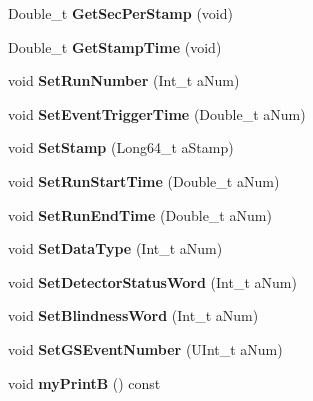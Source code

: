 \begin{DoxyCompactItemize}
\item 
\hypertarget{class_edw_event_base_aaf7066291c2dccc341e3b6ce0fe305d8}{
Double\_\-t {\bfseries GetSecPerStamp} (void)}
\label{class_edw_event_base_aaf7066291c2dccc341e3b6ce0fe305d8}

\item 
\hypertarget{class_edw_event_base_ad03198cffa842e7e9c3c8c46ac893f86}{
Double\_\-t {\bfseries GetStampTime} (void)}
\label{class_edw_event_base_ad03198cffa842e7e9c3c8c46ac893f86}

\item 
\hypertarget{class_edw_event_base_a7b2aafaae6d209b65a5f8a23d18f309f}{
void {\bfseries SetRunNumber} (Int\_\-t aNum)}
\label{class_edw_event_base_a7b2aafaae6d209b65a5f8a23d18f309f}

\item 
\hypertarget{class_edw_event_base_a9c5fa083dec2ba2025df5d617e062f92}{
void {\bfseries SetEventTriggerTime} (Double\_\-t aNum)}
\label{class_edw_event_base_a9c5fa083dec2ba2025df5d617e062f92}

\item 
\hypertarget{class_edw_event_base_ad6c6d7690b881e9eee222e27830dcc31}{
void {\bfseries SetStamp} (Long64\_\-t aStamp)}
\label{class_edw_event_base_ad6c6d7690b881e9eee222e27830dcc31}

\item 
\hypertarget{class_edw_event_base_a29e04d71d85d8eb744149fe83649a259}{
void {\bfseries SetRunStartTime} (Double\_\-t aNum)}
\label{class_edw_event_base_a29e04d71d85d8eb744149fe83649a259}

\item 
\hypertarget{class_edw_event_base_a0b2c1aab2b1334456e368b158a7e9d5a}{
void {\bfseries SetRunEndTime} (Double\_\-t aNum)}
\label{class_edw_event_base_a0b2c1aab2b1334456e368b158a7e9d5a}

\item 
\hypertarget{class_edw_event_base_a1e842df2f93ffab1063fa40e1e11f92b}{
void {\bfseries SetDataType} (Int\_\-t aNum)}
\label{class_edw_event_base_a1e842df2f93ffab1063fa40e1e11f92b}

\item 
\hypertarget{class_edw_event_base_ab271a85f6cfb2e2fc84ebd5e2b967e7c}{
void {\bfseries SetDetectorStatusWord} (Int\_\-t aNum)}
\label{class_edw_event_base_ab271a85f6cfb2e2fc84ebd5e2b967e7c}

\item 
\hypertarget{class_edw_event_base_a0b80fc110c99f7c503290dbe2e900f43}{
void {\bfseries SetBlindnessWord} (Int\_\-t aNum)}
\label{class_edw_event_base_a0b80fc110c99f7c503290dbe2e900f43}

\item 
\hypertarget{class_edw_event_base_ad9537af923f27fd8b3127aed4fe99e16}{
void {\bfseries SetGSEventNumber} (UInt\_\-t aNum)}
\label{class_edw_event_base_ad9537af923f27fd8b3127aed4fe99e16}

\item 
\hypertarget{class_edw_event_base_a05e2361c16977fbac359685ef5424b1f}{
void {\bfseries myPrintB} () const }
\label{class_edw_event_base_a05e2361c16977fbac359685ef5424b1f}

\end{DoxyCompactItemize}
